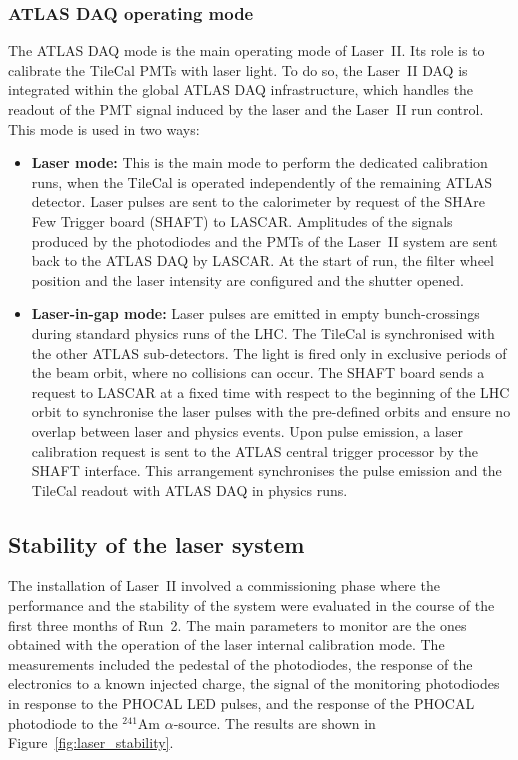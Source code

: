 \subsubsection*{ATLAS DAQ operating mode}

The ATLAS DAQ mode is the main operating mode of Laser~II. Its role is to calibrate the TileCal PMTs with laser light. To do so, the Laser~II DAQ is integrated within the global ATLAS DAQ infrastructure, which handles the readout of the PMT signal induced by the laser and the Laser~II run control. This mode is used in two ways:

\begin{itemize}
\item \textbf{Laser mode:} This is the main mode to perform the dedicated calibration runs, when the TileCal is operated independently of the remaining ATLAS detector. 
Laser pulses are sent to the calorimeter by request of the SHAre Few Trigger board (SHAFT) to LASCAR. 
Amplitudes of the signals produced by the photodiodes and the PMTs of the Laser~II system are sent back to the ATLAS DAQ by LASCAR. At the start of run, the filter wheel position and the laser intensity are configured and the shutter opened.
\item \textbf{Laser-in-gap mode:} Laser pulses are emitted in empty bunch-crossings during standard physics runs of the LHC. The TileCal is synchronised with the other ATLAS sub-detectors. The light is fired only in exclusive periods of the beam orbit, where no collisions can occur. The SHAFT board sends a request to LASCAR at a fixed time with respect to the beginning of the LHC orbit to synchronise the laser pulses with the pre-defined orbits and ensure no overlap between laser and physics events. Upon pulse emission, a laser calibration request is sent to the ATLAS central trigger processor by the SHAFT interface. This arrangement synchronises the pulse emission and the TileCal readout with ATLAS DAQ in physics runs.

\end{itemize}

\subsection{Stability of the laser system}

The installation of Laser~II involved a commissioning phase where the performance and the stability of the system were evaluated in the course of the first three months of Run~2. The main parameters to monitor are the ones obtained with the operation of the laser internal calibration mode. The measurements included the pedestal of the photodiodes, the response of the electronics to a known injected charge, the signal of the monitoring photodiodes in response to the PHOCAL LED pulses, and the response of the PHOCAL photodiode to the $^{241}$Am $\alpha$-source. The results are shown in Figure~\ref{fig:laser_stability}. 


